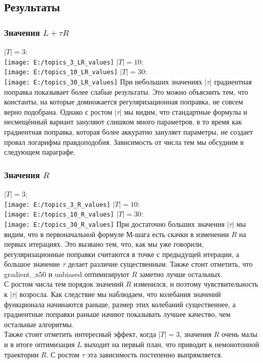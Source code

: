 \documentclass[12pt]{article}
\begin{document}
\subsection{Результаты}
\subsubsection{Значения $L + \tau R$}
$|T| = 3$:\\
\texttt{[image: E:/topics\_3\_LR\_values]}
\newpage
$|T| = 10$:\\
\texttt{[image: E:/topics\_10\_LR\_values]}
$|T| = 30$:\\
\texttt{[image: E:/topics\_30\_LR\_values]}
При небольших значениях $|\tau|$ градиентная поправка показывает более слабые результаты. Это можно объяснить тем, что константы, на которые домножается регуляризационная поправка,  не совсем верно подобрана. Однако с ростом $|\tau|$ мы видим, что стандартные формулы и несмещённый вариант зануляют слишком много параметров, в то время как градиентная поправка, которая более аккуратно зануляет параметры, не создает провал логарифма правдоподобия. Зависимость от числа тем мы обсудиим в следующем параграфе.
\subsubsection{Значения $R$}
$|T| = 3$:\\
\texttt{[image: E:/topics\_3\_R\_values]}
$|T| = 10$:\\
\texttt{[image: E:/topics\_10\_R\_values]}
\newpage
$|T| = 30$:\\
\texttt{[image: E:/topics\_30\_R\_values]}
При достаточно больших значения $|\tau|$ мы видим, что в первоначальной формуле М-шага есть скачки в изменении $R$ на первых итерациях. Это вызвано тем, что, как мы уже говорили, регуляризационные поправки считаются в точке с предыдущей итерации, а большое значение $\tau$ делает различие существенным. Также стоит отметить, что gradient\_x50 и unbiased оптимизируют $R$ заметно лучше остальных.\\
С ростом числа тем порядок значений $R$ изменился, и поэтому чувствительность к $|\tau|$ возросла. Как следствие мы наблюдаем, что колебания значений функционала начинаются раньше, размер этих колебаний существеннее, а градиентные поправки раньше начиют показывать лучшее качество, чем остальные алгоритмы.\\
Также стоит отметить интересный эффект, когда $|T| = 3$, значения $R$ очень малы и в итоге оптимизация $L$ выходит на первый план, что приводит к немонотонной траектории $R$. С ростом $\tau$ эта зависимость постепенно выпрямляется.
\end{document}
